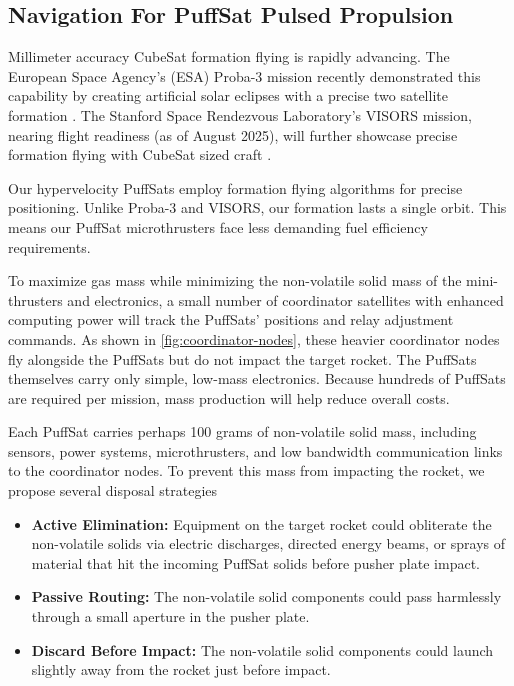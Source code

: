 \documentclass{article}
\begin{document}
\subsection{Navigation For PuffSat Pulsed Propulsion}\label{sec:neural_navigation}
Millimeter accuracy CubeSat formation flying is rapidly advancing. The European Space Agency's (ESA) Proba-3 mission recently demonstrated this capability by creating artificial solar eclipses with a precise two satellite formation \cite{esa_proba_3}. The Stanford Space Rendezvous Laboratory's VISORS mission, nearing flight readiness (as of August 2025), will further showcase precise formation flying with CubeSat sized craft \cite{guffanti2023autonomous}.  

Our hypervelocity PuffSats employ formation flying algorithms for precise positioning.  Unlike Proba-3 and VISORS, our formation lasts a single orbit. This means our PuffSat microthrusters face less demanding fuel efficiency requirements.

To maximize gas mass while minimizing the non-volatile solid mass of the mini-thrusters and electronics, a small number of coordinator satellites with enhanced computing power will track the PuffSats' positions and relay adjustment commands. As shown in \autoref{fig:coordinator-nodes}, these heavier coordinator nodes fly alongside the PuffSats but do not impact the target rocket. The PuffSats themselves carry only simple, low-mass electronics. Because hundreds of PuffSats are required per mission, mass production will help reduce overall costs.

Each PuffSat carries perhaps 100 grams of non-volatile solid mass, including sensors, power systems, microthrusters, and low bandwidth communication links to the coordinator nodes. To prevent this mass from impacting the rocket, we propose several disposal strategies
\begin{itemize}
    \item \textbf{Active Elimination:} Equipment on the target rocket could obliterate the non-volatile solids via electric discharges, directed energy beams, or sprays of material that hit the incoming PuffSat solids before pusher plate impact.
    \item \textbf{Passive Routing:} The non-volatile solid components could pass harmlessly through a small aperture in the pusher plate.
    \item \textbf{Discard Before Impact:}  The non-volatile solid components could launch slightly away from the rocket just before impact. \label{item:discard_before_impact}
\end{itemize} 
\end{document}
